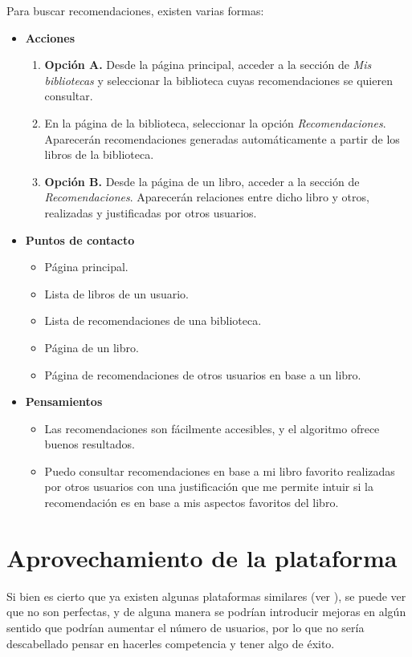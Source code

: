 Para buscar recomendaciones, existen varias formas:
\begin{itemize}
    \item \textbf{Acciones}
    \begin{enumerate}
        \item \textbf{Opción A.} Desde la página principal, acceder a la sección de \textit{Mis bibliotecas} y seleccionar la biblioteca cuyas recomendaciones se quieren consultar.
        \item En la página de la biblioteca, seleccionar la opción \textit{Recomendaciones}. Aparecerán recomendaciones generadas automáticamente a partir de los libros de la biblioteca.
        \item \textbf{Opción B.} Desde la página de un libro, acceder a la sección de \textit{Recomendaciones}. Aparecerán relaciones entre dicho libro y otros, realizadas y justificadas por otros usuarios.
    \end{enumerate}
\item \textbf{Puntos de contacto}
    \begin{itemize}
        \item Página principal.
        \item Lista de libros de un usuario.
        \item Lista de recomendaciones de una biblioteca.
        \item Página de un libro.
        \item Página de recomendaciones de otros usuarios en base a un libro.
    \end{itemize}
\item \textbf{Pensamientos}
    \begin{itemize}
        \item Las recomendaciones son fácilmente accesibles, y el algoritmo ofrece buenos resultados.
        \item Puedo consultar recomendaciones en base a mi libro favorito realizadas por otros usuarios con una justificación que me permite intuir si la recomendación es en base a mis aspectos favoritos del libro.
    \end{itemize}
\end{itemize}

\section{Aprovechamiento de la plataforma}
Si bien es cierto que ya existen algunas plataformas similares (ver \underline{}), se puede ver que no son perfectas, y de alguna manera se podrían introducir mejoras en algún sentido que podrían aumentar el número de usuarios, por lo que no sería descabellado pensar en hacerles competencia y tener algo de éxito.

